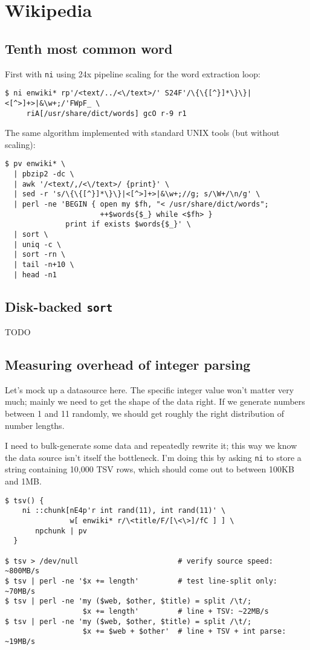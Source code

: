\section{Wikipedia}
\subsection{Tenth most common word}
First with {\tt ni} using 24x pipeline scaling for the word extraction loop:

\begin{verbatim}
$ ni enwiki* rp'/<text/../<\/text>/' S24F'/\{\{[^}]*\}\}|<[^>]+>|&\w+;/'FWpF_ \
     riA[/usr/share/dict/words] gcO r-9 r1\end{verbatim}

The same algorithm implemented with standard UNIX tools (but without scaling):

\begin{verbatim}
$ pv enwiki* \
  | pbzip2 -dc \
  | awk '/<text/,/<\/text>/ {print}' \
  | sed -r 's/\{\{[^}]*\}\}|<[^>]+>|&\w+;//g; s/\W+/\n/g' \
  | perl -ne 'BEGIN { open my $fh, "< /usr/share/dict/words";
                      ++$words{$_} while <$fh> }
              print if exists $words{$_}' \
  | sort \
  | uniq -c \
  | sort -rn \
  | tail -n+10 \
  | head -n1\end{verbatim}

\subsection{Disk-backed {\tt sort}}
TODO

\subsection{Measuring overhead of integer parsing}
Let's mock up a datasource here. The specific integer value won't matter very
much; mainly we need to get the shape of the data right. If we generate numbers
between 1 and 11 randomly, we should get roughly the right distribution of
number lengths.

I need to bulk-generate some data and repeatedly rewrite it; this way we know
the data source isn't itself the bottleneck. I'm doing this by asking {\tt ni}
to store a string containing 10,000 TSV rows, which should come out to between
100KB and 1MB.

\begin{verbatim}
$ tsv() {
    ni ::chunk[nE4p'r int rand(11), int rand(11)' \
               w[ enwiki* r/\<title/F/[\<\>]/fC ] ] \
       npchunk | pv
  }

$ tsv > /dev/null                       # verify source speed: ~800MB/s
$ tsv | perl -ne '$x += length'         # test line-split only: ~70MB/s
$ tsv | perl -ne 'my ($web, $other, $title) = split /\t/;
                  $x += length'         # line + TSV: ~22MB/s
$ tsv | perl -ne 'my ($web, $other, $title) = split /\t/;
                  $x += $web + $other'  # line + TSV + int parse: ~19MB/s\end{verbatim}

